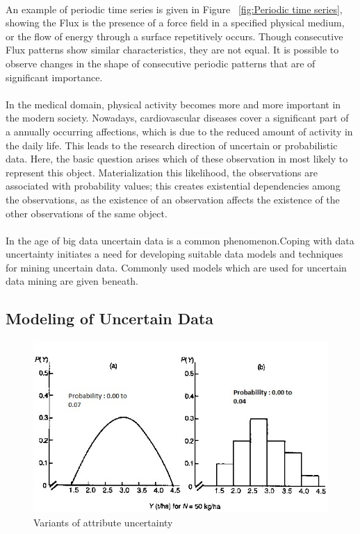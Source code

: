 \paragraph{}
An example of periodic time series is given in Figure ~\ref{fig:Periodic time series}, showing the Flux is the presence of a force field in a specified physical medium, or the flow of energy through a surface repetitively occurs. Though consecutive Flux patterns show similar characteristics, they are not equal. It is possible to observe changes in the shape of consecutive periodic patterns that are of significant importance.
\paragraph{}
In the medical domain, physical activity becomes more and more important in the modern society. Nowadays, cardiovascular diseases cover a significant part of a annually occurring affections, which is due to the reduced amount of activity in the daily life. This leads to the research direction of uncertain or probabilistic data. Here, the basic question arises which of these observation in most likely to represent this object. Materialization this likelihood, the observations are associated with probability values; this creates existential dependencies among the observations, as the existence of an observation affects the existence of the other observations of the same object.
\paragraph{}
In the age of big data uncertain data is a common phenomenon.Coping with data uncertainty initiates a need for developing suitable data models and techniques for mining uncertain data. Commonly used models which are used for uncertain data mining are given beneath.
\subsection{Modeling of Uncertain Data}

\begin{figure}[h!]
\includegraphics[width=1\textwidth]{images/ra_3}
\caption{Variants of attribute uncertainty}
\label{fig:Uncertainty modeling}
\end{figure}
